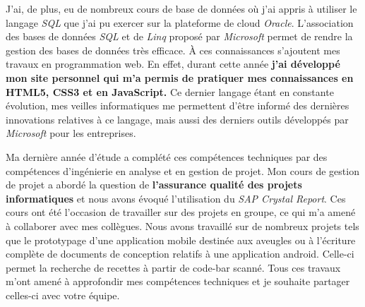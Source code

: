 J'ai, de plus, eu de nombreux cours de base de données où j'ai appris à utiliser le langage \textit{SQL} que j'ai pu exercer sur la plateforme de cloud \textit{Oracle}. L'association des bases de données \textit{SQL} et de \textit{Linq} proposé par \textit{Microsoft} permet de rendre la gestion des bases de données très efficace. À ces connaissances s'ajoutent mes travaux en programmation web. En effet, durant cette année \textbf{j'ai développé mon site personnel qui m'a permis de pratiquer mes connaissances en HTML5, CSS3 et en JavaScript.} Ce dernier langage étant en constante évolution, mes veilles informatiques me permettent d'être informé des dernières innovations relatives à ce langage, mais aussi des derniers outils développés par \textit{Microsoft} pour les entreprises.

Ma dernière année d'étude a complété ces compétences techniques par des compétences d'ingénierie en analyse et en gestion de projet. Mon cours de gestion de projet a abordé la question de \textbf{l'assurance qualité des projets informatiques} et nous avons évoqué l'utilisation du \textit{SAP Crystal Report}. Ces cours ont été l'occasion de travailler sur des projets en groupe, ce qui m'a amené à collaborer avec mes collègues. Nous avons travaillé sur de nombreux projets tels que le prototypage d'une application mobile destinée aux aveugles ou à l'écriture complète de documents de conception relatifs à une application android. Celle-ci permet la recherche de recettes à partir de code-bar scanné. Tous ces travaux m'ont amené à approfondir mes compétences techniques et je souhaite partager celles-ci avec votre équipe.

\makeletterclosing

